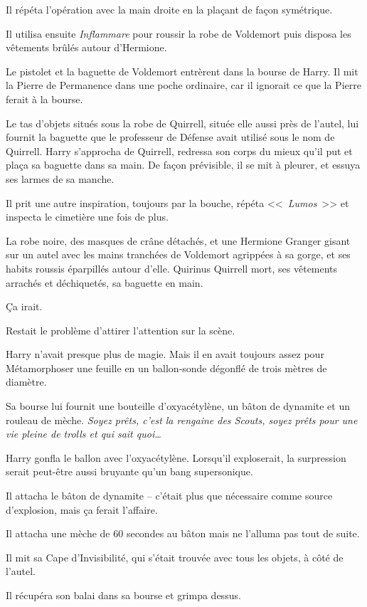 Il répéta l'opération avec la main droite en la plaçant de façon symétrique.

Il utilisa ensuite \emph{Inflammare} pour roussir la robe de Voldemort puis disposa les vêtements brûlés autour d'Hermione.

Le pistolet et la baguette de Voldemort entrèrent dans la bourse de Harry. Il mit la Pierre de Permanence dans une poche ordinaire, car il ignorait ce que la Pierre ferait à la bourse.

Le tas d'objets situés sous la robe de Quirrell, située elle aussi près de l'autel, lui fournit la baguette que le professeur de Défense avait utilisé sous le nom de Quirrell. Harry s'approcha de Quirrell, redressa son corps du mieux qu'il put et plaça sa baguette dans sa main. De façon prévisible, il se mit à pleurer, et essuya ses larmes de sa manche.

Il prit une autre inspiration, toujours par la bouche, répéta <<~\emph{Lumos}~>> et inspecta le cimetière une fois de plus.

La robe noire, des masques de crâne détachés, et une Hermione Granger gisant sur un autel avec les mains tranchées de Voldemort agrippées à sa gorge, et ses habits roussis éparpillés autour d'elle. Quirinus Quirrell mort, ses vêtements arrachés et déchiquetés, sa baguette en main.

Ça irait.

Restait le problème d'attirer l'attention sur la scène.

Harry n'avait presque plus de magie. Mais il en avait toujours assez pour Métamorphoser une feuille en un ballon-sonde dégonflé de trois mètres de diamètre.

Sa bourse lui fournit une bouteille d'oxyacétylène, un bâton de dynamite et un rouleau de mèche. \emph{Soyez prêts, c'est la rengaine des Scouts, soyez prêts pour une vie pleine de trolls et qui sait quoi…}

Harry gonfla le ballon avec l'oxyacétylène. Lorsqu'il exploserait, la surpression serait peut-être aussi bruyante qu'un bang supersonique.

Il attacha le bâton de dynamite -- c'était plus que nécessaire comme source d'explosion, mais ça ferait l'affaire.

Il attacha une mèche de 60 secondes au bâton mais ne l'alluma pas tout de suite.

Il mit sa Cape d'Invisibilité, qui s'était trouvée avec tous les objets, à côté de l'autel.

Il récupéra son balai dans sa bourse et grimpa dessus.


